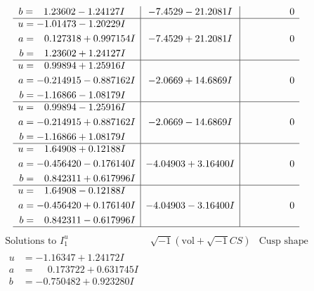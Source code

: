 \documentclass[1p]{elsarticle_modified}
\theoremstyle{definition}
\newcommand{\I}{\sqrt{-1}}
\begin{document}
$$\begin{array}{c|c|c}
\begin{aligned}
b &= \phantom{-}1.23602 - 1.24127 I\end{aligned}
 & -7.4529 - 21.2081 I & \phantom{-0.000000 } 0 \\ \hline\begin{aligned}
u &= -1.01473 - 1.20229 I \\
a &= \phantom{-}0.127318 + 0.997154 I \\
b &= \phantom{-}1.23602 + 1.24127 I\end{aligned}
 & -7.4529 + 21.2081 I & \phantom{-0.000000 } 0 \\ \hline\begin{aligned}
u &= \phantom{-}0.99894 + 1.25916 I \\
a &= -0.214915 - 0.887162 I \\
b &= -1.16866 - 1.08179 I\end{aligned}
 & -2.0669 + 14.6869 I & \phantom{-0.000000 } 0 \\ \hline\begin{aligned}
u &= \phantom{-}0.99894 - 1.25916 I \\
a &= -0.214915 + 0.887162 I \\
b &= -1.16866 + 1.08179 I\end{aligned}
 & -2.0669 - 14.6869 I & \phantom{-0.000000 } 0 \\ \hline\begin{aligned}
u &= \phantom{-}1.64908 + 0.12188 I \\
a &= -0.456420 - 0.176140 I \\
b &= \phantom{-}0.842311 + 0.617996 I\end{aligned}
 & -4.04903 + 3.16400 I & \phantom{-0.000000 } 0 \\ \hline\begin{aligned}
u &= \phantom{-}1.64908 - 0.12188 I \\
a &= -0.456420 + 0.176140 I \\
b &= \phantom{-}0.842311 - 0.617996 I\end{aligned}
 & -4.04903 - 3.16400 I & \phantom{-0.000000 } 0\\
 \hline 
 \end{array}$$\newpage$$\begin{array}{c|c|c}  
\text{Solutions to }I^u_{1}& \I (\text{vol} + \sqrt{-1}CS) & \text{Cusp shape}\\
 \hline 
\begin{aligned}
u &= -1.16347 + 1.24172 I \\
a &= \phantom{-}0.173722 + 0.631745 I \\
b &= -0.750482 + 0.923280 I\end{aligned}

\end{array}$$
\end{document}
